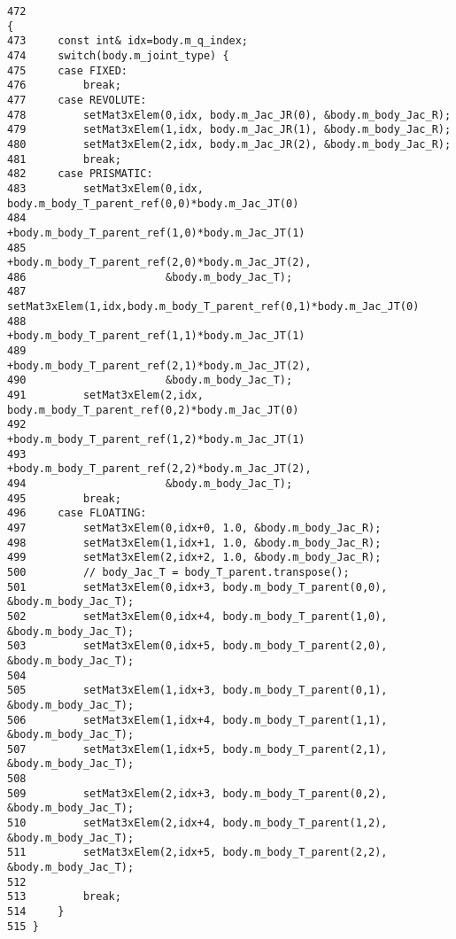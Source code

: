 \begin{Code}\begin{verbatim}472                                                                             {
473     const int& idx=body.m_q_index;
474     switch(body.m_joint_type) {
475     case FIXED:
476         break;
477     case REVOLUTE:
478         setMat3xElem(0,idx, body.m_Jac_JR(0), &body.m_body_Jac_R);
479         setMat3xElem(1,idx, body.m_Jac_JR(1), &body.m_body_Jac_R);
480         setMat3xElem(2,idx, body.m_Jac_JR(2), &body.m_body_Jac_R);
481         break;
482     case PRISMATIC:
483         setMat3xElem(0,idx, body.m_body_T_parent_ref(0,0)*body.m_Jac_JT(0)
484                      +body.m_body_T_parent_ref(1,0)*body.m_Jac_JT(1)
485                      +body.m_body_T_parent_ref(2,0)*body.m_Jac_JT(2),
486                      &body.m_body_Jac_T);
487         setMat3xElem(1,idx,body.m_body_T_parent_ref(0,1)*body.m_Jac_JT(0)
488                      +body.m_body_T_parent_ref(1,1)*body.m_Jac_JT(1)
489                      +body.m_body_T_parent_ref(2,1)*body.m_Jac_JT(2),
490                      &body.m_body_Jac_T);
491         setMat3xElem(2,idx, body.m_body_T_parent_ref(0,2)*body.m_Jac_JT(0)
492                      +body.m_body_T_parent_ref(1,2)*body.m_Jac_JT(1)
493                      +body.m_body_T_parent_ref(2,2)*body.m_Jac_JT(2),
494                      &body.m_body_Jac_T);
495         break;
496     case FLOATING:
497         setMat3xElem(0,idx+0, 1.0, &body.m_body_Jac_R);
498         setMat3xElem(1,idx+1, 1.0, &body.m_body_Jac_R);
499         setMat3xElem(2,idx+2, 1.0, &body.m_body_Jac_R);
500         // body_Jac_T = body_T_parent.transpose();
501         setMat3xElem(0,idx+3, body.m_body_T_parent(0,0), &body.m_body_Jac_T);
502         setMat3xElem(0,idx+4, body.m_body_T_parent(1,0), &body.m_body_Jac_T);
503         setMat3xElem(0,idx+5, body.m_body_T_parent(2,0), &body.m_body_Jac_T);
504 
505         setMat3xElem(1,idx+3, body.m_body_T_parent(0,1), &body.m_body_Jac_T);
506         setMat3xElem(1,idx+4, body.m_body_T_parent(1,1), &body.m_body_Jac_T);
507         setMat3xElem(1,idx+5, body.m_body_T_parent(2,1), &body.m_body_Jac_T);
508 
509         setMat3xElem(2,idx+3, body.m_body_T_parent(0,2), &body.m_body_Jac_T);
510         setMat3xElem(2,idx+4, body.m_body_T_parent(1,2), &body.m_body_Jac_T);
511         setMat3xElem(2,idx+5, body.m_body_T_parent(2,2), &body.m_body_Jac_T);
512 
513         break;
514     }
515 }
\end{verbatim}
\end{Code}




